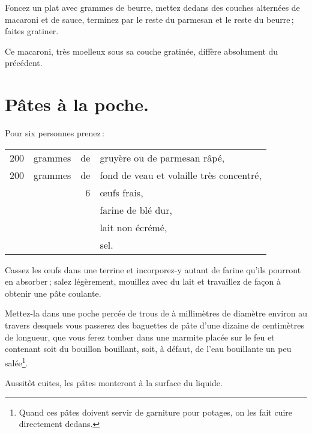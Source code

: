 Foncez un plat avec {\mmm} grammes de beurre, mettez dedans des couches
alternées de macaroni et de sauce, terminez par le reste du parmesan et le
reste du beurre ; faites gratiner.

Ce macaroni, très moelleux sous sa couche gratinée, diffère absolument du
précédent.

\section*{\centering Pâtes à la poche.}
{}

Pour six personnes prenez :

\footnotesize
\begin{longtable}{rrrp{16em}}
    200 & grammes & de & gruyère ou de parmesan râpé,                                                     \\
    200 & grammes & de & fond de veau et volaille très concentré,                                         \\
        &         &  6 & œufs frais,                                                                      \\
        &         &    & farine de blé dur,                                                               \\
        &         &    & lait non écrémé,                                                                 \\
        &         &    & sel.                                                                             \\
\end{longtable}
\normalsize

Cassez les œufs dans une terrine et incorporez-y autant de farine qu'ils
pourront en absorber ; salez légèrement, mouillez avec du lait et travaillez de
façon à obtenir une pâte coulante.

Mettez-la dans une poche percée de trous de {\mmm} à {\mmm}
millimètres de diamètre environ au travers desquels vous passerez des baguettes
de pâte d'une dizaine de centimètres de longueur, que vous ferez tomber dans
une marmite placée sur le feu et contenant soit du bouillon bouillant, soit,
à défaut, de l'eau bouillante un peu salée\footnote{Quand ces pâtes doivent
servir de garniture pour potages, on les fait cuire directement dedans.}.

Aussitôt cuites, les pâtes monteront à la surface du liquide.

